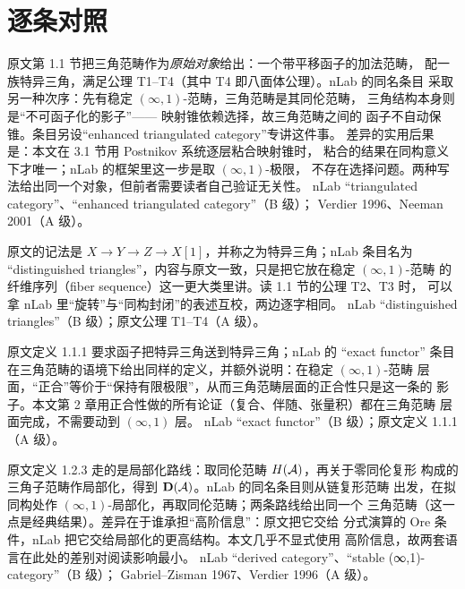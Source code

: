 \section{逐条对照}

\begin{conceptlist}

%
{原文第 1.1 节把三角范畴作为\emph{原始对象}给出：一个带平移函子的加法范畴，
配一族特异三角，满足公理 T1--T4（其中 T4 即八面体公理）。nLab 的同名条目
采取另一种次序：先有稳定 $(\infty,1)$-范畴，三角范畴是其同伦范畴，
三角结构本身则是“不可函子化的影子”—— 映射锥依赖选择，故三角范畴之间的
函子不自动保锥。条目另设“enhanced triangulated category”专讲这件事。
差异的实用后果是：本文在 3.1 节用 Postnikov 系统逐层粘合映射锥时，
粘合的结果在同构意义下才唯一；nLab 的框架里这一步是取 $(\infty,1)$-极限，
不存在选择问题。两种写法给出同一个对象，但前者需要读者自己验证无关性。}%
{nLab “triangulated category”、“enhanced triangulated category”（B 级）；
Verdier 1996、Neeman 2001（A 级）。}

%
{原文的记法是 $X\to Y\to Z\to X[1]$，并称之为特异三角；nLab 条目名为
“distinguished triangles”，内容与原文一致，只是把它放在稳定 $(\infty,1)$-范畴
的纤维序列（fiber sequence）这一更大类里讲。读 1.1 节的公理 T2、T3 时，
可以拿 nLab 里“旋转”与“同构封闭”的表述互校，两边逐字相同。}%
{nLab “distinguished triangles”（B 级）；原文公理 T1--T4（A 级）。}

%
{原文定义 1.1.1 要求函子把特异三角送到特异三角；nLab 的 “exact functor”
条目在三角范畴的语境下给出同样的定义，并额外说明：在稳定 $(\infty,1)$-范畴
层面，“正合”等价于“保持有限极限”，从而三角范畴层面的正合性只是这一条的
影子。本文第 2 章用正合性做的所有论证（复合、伴随、张量积）都在三角范畴
层面完成，不需要动到 $(\infty,1)$ 层。}%
{nLab “exact functor”（B 级）；原文定义 1.1.1（A 级）。}

%
{原文定义 1.2.3 走的是局部化路线：取同伦范畴 $H(\mathcal{A})$，再关于零同伦复形
构成的三角子范畴作局部化，得到 $\mathbf{D}(\mathcal{A})$。nLab 的同名条目则从链复形范畴
出发，在拟同构处作 $(\infty,1)$-局部化，再取同伦范畴；两条路线给出同一个
三角范畴（这一点是经典结果）。差异在于谁承担“高阶信息”：原文把它交给
分式演算的 Ore 条件，nLab 把它交给局部化的更高结构。本文几乎不显式使用
高阶信息，故两套语言在此处的差别对阅读影响最小。}%
{nLab “derived category”、“stable (∞,1)-category”（B 级）；
Gabriel--Zisman 1967、Verdier 1996（A 级）。}


\end{conceptlist}
